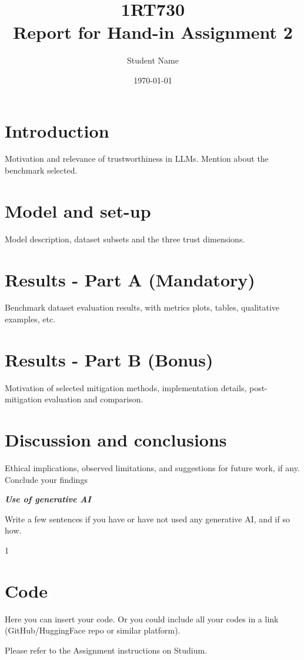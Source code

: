 \documentclass[a4paper,10pt]{article}
\title{\textbf{1RT730} 
	\\ Report for Hand-in Assignment 2}
\author{Student Name}
\date{\today}
\begin{document}
	
	\maketitle
	
	\section{Introduction}
    Motivation and relevance of trustworthiness in LLMs. Mention about the benchmark selected.

    \section{Model and set-up}
    Model description, dataset subsets and the three trust dimensions.

    \section{Results - Part A (Mandatory)}
    Benchmark dataset evaluation results, with metrics plots, tables, qualitative examples, etc. 

    \section{Results - Part B (Bonus)}
    Motivation of selected mitigation methods, implementation details, post-mitigation evaluation and comparison.  

    \section{Discussion and conclusions}
    Ethical implications, observed limitations, and suggestions for future work, if any. Conclude your findings

	

\hfill \break
\textit{\textbf{Use of generative AI}}

Write a few sentences if you have or have not used any generative AI, and if so how.

\begin{thebibliography}{1}


		
\end{thebibliography}


\appendix
\section{Code}
Here you can insert your code. Or you could include all your codes in a link (GitHub/HuggingFace repo or similar platform).


Please refer to the Assignment instructions on Studium. 


\label{app:code}
\inputminted[frame=lines,framesep=2mm,linenos]{python}{your_code.py}

	
\end{document}

